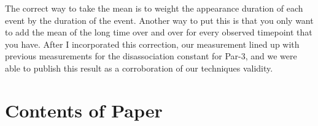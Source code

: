 The correct way to take the mean is to weight the appearance duration of each event by the duration of the event.  Another way to put this is that you only want to add the mean of the long time over and over for every observed timepoint that you have.  After I incorporated this correction, our measurement lined up with previous measurements for the disassociation constant for Par-3, and we were able to publish this result as a corroboration of our techniques validity.

\section{Contents of Paper}

